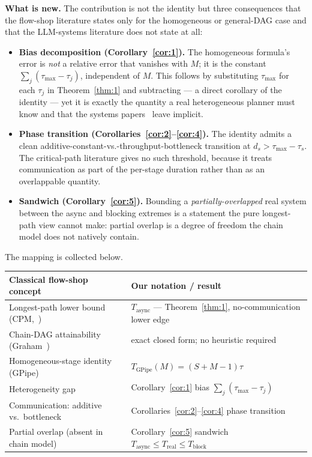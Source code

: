 \documentclass[11pt]{article}
\begin{document}
\textbf{What is new.} The contribution is not the identity but three consequences that the flow-shop literature states only for the homogeneous or general-DAG case and that the LLM-systems literature does not state at all:

\begin{itemize}
\item \textbf{Bias decomposition (Corollary~\ref{cor:1}).} The homogeneous formula's error is \emph{not} a relative error that vanishes with $M$; it is the constant $\sum_j(\tau_{\max}-\tau_j)$, independent of $M$. This follows by substituting $\tau_{\max}$ for each $\tau_j$ in Theorem~\ref{thm:1} and subtracting --- a direct corollary of the identity --- yet it is exactly the quantity a real heterogeneous planner must know and that the systems papers~\cite{r25,r26,r27,r28} leave implicit.
\item \textbf{Phase transition (Corollaries~\ref{cor:2}--\ref{cor:4}).} The identity admits a clean additive-constant-vs.-throughput-bottleneck transition at $d_s > \tau_{\max}-\tau_s$. The critical-path literature gives no such threshold, because it treats communication as part of the per-stage duration rather than as an overlappable quantity.
\item \textbf{Sandwich (Corollary~\ref{cor:5}).} Bounding a \emph{partially-overlapped} real system between the async and blocking extremes is a statement the pure longest-path view cannot make: partial overlap is a degree of freedom the chain model does not natively contain.
\end{itemize}

The mapping is collected below.

\begin{center}
\begin{tabular}{ll}
\toprule
Classical flow-shop concept & Our notation / result \\
\midrule
Longest-path lower bound (CPM,~\cite{r4}) & $T_{\text{async}}$ --- Theorem~\ref{thm:1}, no-communication lower edge \\
Chain-DAG attainability (Graham~\cite{r2}) & exact closed form; no heuristic required \\
Homogeneous-stage identity (GPipe) & $T_{\text{GPipe}}(M) = (S+M-1)\tau$ \\
Heterogeneity gap & Corollary~\ref{cor:1} bias $\sum_j(\tau_{\max}-\tau_j)$ \\
Communication: additive vs.\ bottleneck & Corollaries~\ref{cor:2}--\ref{cor:4} phase transition \\
Partial overlap (absent in chain model) & Corollary~\ref{cor:5} sandwich $T_{\text{async}} \le T_{\text{real}} \le T_{\text{block}}$ \\
\bottomrule
\end{tabular}
\end{center}
\end{document}
